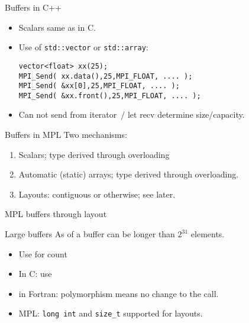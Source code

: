 \begin{cxx}
\begin{numberedframe}{Buffers in C++}
 \lstset{language=C++}
  \begin{itemize}
  \item Scalars same as in C.
  \item Use of \lstinline+std::vector+ or \lstinline+std::array+:
\begin{lstlisting}
vector<float> xx(25);
MPI_Send( xx.data(),25,MPI_FLOAT, .... );
MPI_Send( &xx[0],25,MPI_FLOAT, .... );
MPI_Send( &xx.front(),25,MPI_FLOAT, .... );
\end{lstlisting}
\item Can not send from iterator~/
  let recv determine size/capacity.
  \end{itemize}
 \lstset{language=C}
\end{numberedframe}
\end{cxx}

\begin{mpl}
  \addtocounter{slidecount}{-1}
\begin{numberedframe}{Buffers in MPL}
  Two mechanisms:
  \begin{enumerate}
  \item Scalars; type derived through overloading
  \item Automatic (static) arrays; type derived through overloading.
  \item Layouts: contiguous or otherwise; see later.
  \end{enumerate}  
\end{numberedframe}
\begin{numberedframe}{MPL buffers through layout}
  
\end{numberedframe}
\end{mpl}

\begin{numberedframe}{Large buffers}
  As of  a buffer can be longer than $2^{31}$ elements.\\
  \begin{itemize}
  \item Use  for count
  \item In C: use 
  \item in Fortran: polymorphism means no change to the call.
  \item MPL: \lstinline{long int} and \lstinline{size_t} supported for layouts.
  \end{itemize}
\end{numberedframe}

